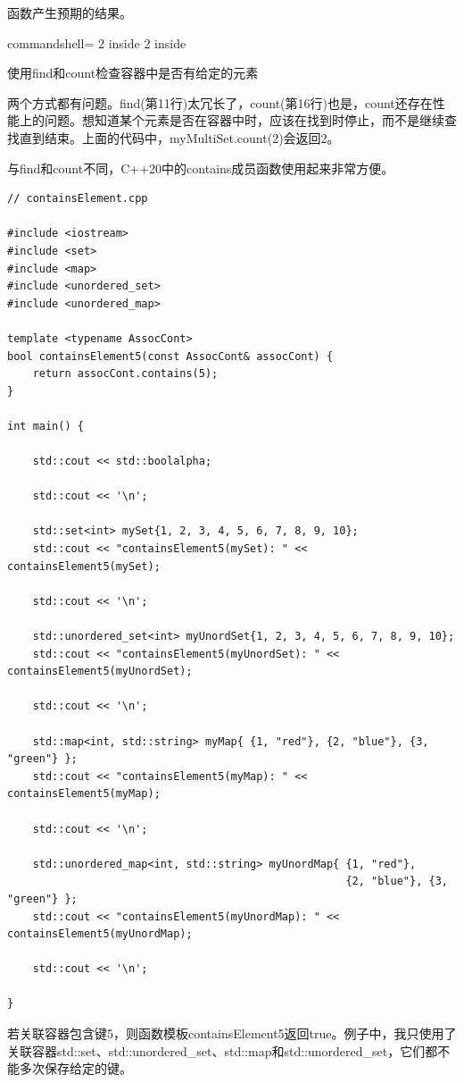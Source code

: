 函数产生预期的结果。

\begin{tcblisting}{commandshell={}}
2 inside
2 inside
\end{tcblisting}

\begin{center}
使用find和count检查容器中是否有给定的元素
\end{center}

两个方式都有问题。find(第11行)太冗长了，count(第16行)也是，count还存在性能上的问题。想知道某个元素是否在容器中时，应该在找到时停止，而不是继续查找直到结束。上面的代码中，myMultiSet.count(2)会返回2。

与find和count不同，C++20中的contains成员函数使用起来非常方便。

\begin{lstlisting}[style=styleCXX]
// containsElement.cpp

#include <iostream>
#include <set>
#include <map>
#include <unordered_set>
#include <unordered_map>

template <typename AssocCont>
bool containsElement5(const AssocCont& assocCont) {
	return assocCont.contains(5);
}

int main() {

	std::cout << std::boolalpha;
	
	std::cout << '\n';
	
	std::set<int> mySet{1, 2, 3, 4, 5, 6, 7, 8, 9, 10};
	std::cout << "containsElement5(mySet): " << containsElement5(mySet);
	
	std::cout << '\n';
	
	std::unordered_set<int> myUnordSet{1, 2, 3, 4, 5, 6, 7, 8, 9, 10};
	std::cout << "containsElement5(myUnordSet): " << containsElement5(myUnordSet);
	
	std::cout << '\n';
	
	std::map<int, std::string> myMap{ {1, "red"}, {2, "blue"}, {3, "green"} };
	std::cout << "containsElement5(myMap): " << containsElement5(myMap);
	
	std::cout << '\n';
	
	std::unordered_map<int, std::string> myUnordMap{ {1, "red"},
	                                                 {2, "blue"}, {3, "green"} };
	std::cout << "containsElement5(myUnordMap): " << containsElement5(myUnordMap);
	
	std::cout << '\n';

}
\end{lstlisting}

若关联容器包含键5，则函数模板containsElement5返回true。例子中，我只使用了关联容器std::set、std::unordered\_set、std::map和std::unordered\_set，它们都不能多次保存给定的键。


